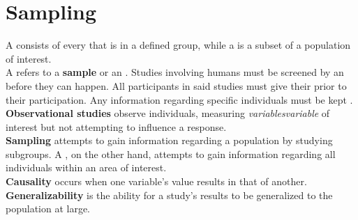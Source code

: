\documentclass[../AP_Statistics.tex]{subfiles}
\begin{document}
	\chapter{Sampling}
		A  consists of every  that is in a defined group, while a  is a subset of a population of interest. \\
		A  refers to a \textbf{sample} or an .
		Studies involving humans must be screened by an  before they can happen. All participants in said studies must give their  prior to their participation. Any information regarding specific individuals must be kept . \\
		\textbf{Observational studies} observe individuals, measuring \emph{variables}\emph{variable} of interest but not attempting to influence a response. \\
		\textbf{Sampling} attempts to gain information regarding a population by studying subgroups. A , on the other hand, attempts to gain information regarding all individuals within an area of interest. \\
		\textbf{Causality} occurs when one variable's value results in that of another. \\
		\textbf{Generalizability} is the ability for a study's results to be generalized to the population at large.
\end{document}

